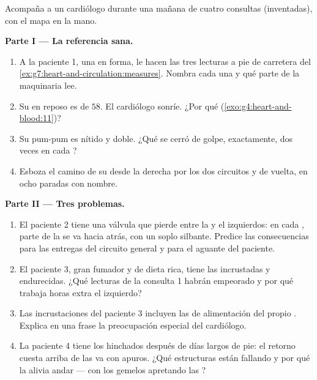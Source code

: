 \begin{problem}\label{pb:g7:heart-and-circulation:1}
Acompaña a un cardiólogo durante una mañana de cuatro consultas
(inventadas), con el mapa en la mano.

\medskip\noindent\textbf{Parte I --- La referencia sana.}
\begin{enumerate}
  \item A la paciente 1, una  en forma, le hacen las tres
        lecturas a pie de carretera del
        \cref{ex:g7:heart-and-circulation:measures}. Nombra cada una y
        qué parte de la maquinaria lee.
  \item Su  en reposo es de $58$. El cardiólogo sonríe. ¿Por qué
        (\cref{exo:g4:heart-and-blood:11})?
  \item Su pum-pum es nítido y doble. ¿Qué se cerró de golpe,
        exactamente, dos veces en cada ?
  \item Esboza el camino de su  desde la  derecha por los
        dos circuitos y de vuelta, en ocho paradas con nombre.
\end{enumerate}

\medskip\noindent\textbf{Parte II --- Tres problemas.}
\begin{enumerate}[resume]
  \item El paciente 2 tiene una válvula que pierde entre la  y
        el  izquierdos: en cada , parte de la  se
        va hacia atrás, con un soplo silbante. Predice las
        consecuencias para las entregas del circuito general y para el
        aguante del paciente.
  \item El paciente 3, gran fumador y de dieta rica, tiene las 
        incrustadas y endurecidas. ¿Qué lecturas de la consulta 1
        habrán empeorado y por qué trabaja horas extra el 
        izquierdo?
  \item Las incrustaciones del paciente 3 incluyen las  de
        alimentación del propio . Explica en una frase la
        preocupación especial del cardiólogo.
  \item La paciente 4 tiene los  hinchados después de días
        largos de pie: el retorno cuesta arriba de las  va con
        apuros. ¿Qué estructuras están fallando y por qué la alivia
        andar --- con los gemelos apretando las ?
\end{enumerate}


\end{problem}
